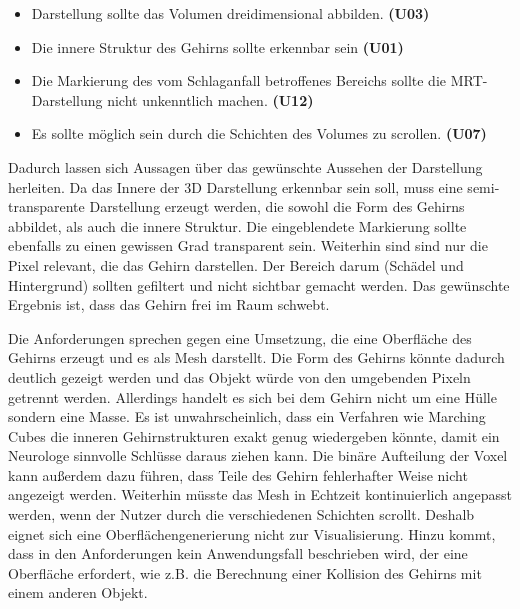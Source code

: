 \begin{itemize}
\item Darstellung sollte das Volumen dreidimensional abbilden. \textbf{(U03)}
\item Die innere Struktur des Gehirns sollte erkennbar sein \textbf{(U01)}
\item Die Markierung des vom Schlaganfall betroffenes Bereichs sollte die MRT-Darstellung nicht unkenntlich machen. \textbf{(U12)}
\item Es sollte möglich sein durch die Schichten des Volumes zu scrollen. \textbf{(U07)}
\end{itemize}

Dadurch lassen sich Aussagen über das gewünschte Aussehen der Darstellung herleiten.
Da das Innere der 3D Darstellung erkennbar sein soll, muss eine semi-transparente Darstellung erzeugt werden, die sowohl die Form des Gehirns abbildet, als auch die innere Struktur. Die eingeblendete Markierung sollte ebenfalls zu einen gewissen Grad transparent sein.
Weiterhin sind sind nur die Pixel relevant, die das Gehirn darstellen. Der Bereich darum (Schädel und Hintergrund) sollten gefiltert  und nicht sichtbar gemacht werden. Das gewünschte Ergebnis ist, dass das Gehirn frei im Raum schwebt. 

Die Anforderungen sprechen gegen eine Umsetzung, die eine Oberfläche des Gehirns erzeugt und es als Mesh darstellt. Die Form des Gehirns könnte dadurch deutlich gezeigt werden und das Objekt würde von den umgebenden Pixeln getrennt werden. 
Allerdings handelt es sich bei dem Gehirn nicht um eine Hülle sondern eine Masse. Es ist unwahrscheinlich, dass ein Verfahren wie Marching Cubes die inneren Gehirnstrukturen exakt genug wiedergeben könnte, damit ein Neurologe sinnvolle Schlüsse daraus ziehen kann. Die binäre Aufteilung der Voxel kann außerdem dazu führen, dass Teile des Gehirn fehlerhafter Weise nicht angezeigt werden. Weiterhin müsste das Mesh in Echtzeit kontinuierlich angepasst werden, wenn der Nutzer durch die verschiedenen Schichten scrollt. 
Deshalb eignet sich eine Oberflächengenerierung nicht zur Visualisierung.
Hinzu kommt, dass in den Anforderungen kein Anwendungsfall beschrieben wird, der eine Oberfläche erfordert, wie z.B. die Berechnung einer Kollision des Gehirns mit einem anderen Objekt.	
	

